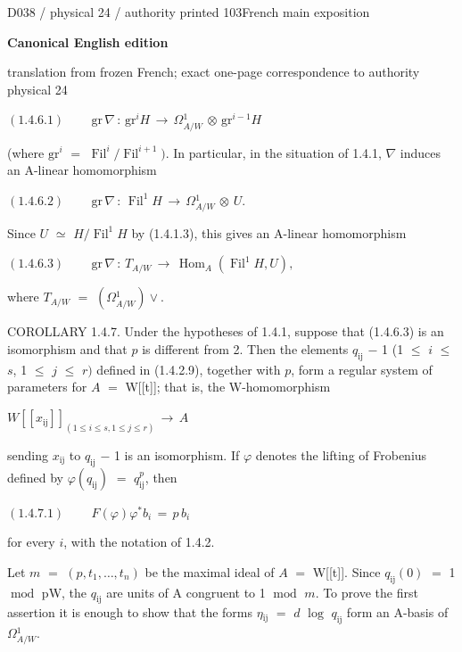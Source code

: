 \documentclass[9pt]{article}
\newcommand{\CanonText}[1]{\par{\fontsize{8.0}{9.35}\selectfont\RaggedRight #1\par}\vspace{2.2pt}}
\newcommand{\CanonDisplay}[1]{\par\vspace{1.2pt}\begin{center}{\fontsize{7.2}{8.4}\selectfont\(\displaystyle #1\)}\end{center}\vspace{1.2pt}}
\newcommand{\LayerTitle}{Canonical English edition}
\begin{document}
\noindent\begin{minipage}[t][\dimexpr\textheight-5pt\relax][t]{\textwidth}
{\sffamily\fontsize{7.3}{8.2}\selectfont\color{Quiet} D038 / physical 24 / authority printed 103\hfill French main exposition}
\par{}\vspace{4.5pt}
{\sffamily\fontsize{10.4}{11.6}\selectfont\bfseries\color{Accent} \LayerTitle}
\par{\sffamily\fontsize{6.7}{7.7}\selectfont\color{Quiet} translation from frozen French; exact one-page correspondence to authority physical 24}
\vspace{5pt}
\CanonDisplay{(1.4.6.1)\qquad\,\text{gr}\,\nabla{}\,:\,\text{gr}^{i}H\,\to{}\,\Omega{}^{1}_{A/W}\,\otimes{}\,\text{gr}^{i-1}H}
\CanonText{(where \(\text{gr}^{i}\) \(=\) \(\operatorname{Fil}^{i}/\operatorname{Fil}^{i+1})\). In particular, in the situation of 1.4.1, \(\nabla{}\) induces an A-linear homomorphism}
\CanonDisplay{(1.4.6.2)\qquad\,\text{gr}\,\nabla{}\,:\,\operatorname{Fil}^{1}H\,\to{}\,\Omega{}^{1}_{A/W}\,\otimes{}\,U.}
\CanonText{Since \(U\) \(\simeq{}\) \(H/\operatorname{Fil}^{1}H\) by (1.4.1.3), this gives an A-linear homomorphism}
\CanonDisplay{(1.4.6.3)\qquad\,\text{gr}\,\nabla{}\,:\,T_{A/W}\,\to{}\,\operatorname{Hom}_{A}(\operatorname{Fil}^{1}H,U),}
\CanonText{where \(T_{A/W}\) \(=\) \((\Omega{}^{1}_{A/W})\vee{}\).}
\CanonText{COROLLARY 1.4.7. Under the hypotheses of 1.4.1, suppose that (1.4.6.3) is an isomorphism and that \(p\) is different from 2. Then the elements \(q_{\mathrm{ij}}\) \(-\) 1 (1 \(\leq{}\) \(i\) \(\leq{}\) \(s\), 1 \(\leq{}\) \(j\) \(\leq{}\) \(r)\) defined in (1.4.2.9), together with \(p\), form a regular system of parameters for \(A\) \(=\) W[[t]]; that is, the W-homomorphism}
\CanonDisplay{W[[x_{\mathrm{ij}}]]_{(1\leq{}i\leq{}s,1\leq{}j\leq{}r)}\,\to{}\,A}
\CanonText{sending \(x_{\mathrm{ij}}\) to \(q_{\mathrm{ij}}\) \(-\) 1 is an isomorphism. If \(\varphi{}\) denotes the lifting of Frobenius defined by \(\varphi{}(q_{\mathrm{ij}})\) \(=\) \(q_{\mathrm{ij}}^{p}\), then}
\CanonDisplay{(1.4.7.1)\qquad\,F(\varphi{})\varphi{}^{*}b_{i}\,=\,p\,b_{i}}
\CanonText{for every \(i\), with the notation of 1.4.2.}
\CanonText{Let \(m\) \(=\) \((p,t_{1},\ldots{},t_{n})\) be the maximal ideal of \(A\) \(=\) W[[t]]. Since \(q_{\mathrm{ij}}(0)\) \(=\) 1 \(\operatorname{mod}\) pW, the \(q_{\mathrm{ij}}\) are units of A congruent to 1 \(\operatorname{mod}\) \(m\). To prove the first assertion it is enough to show that the forms \(\eta{}_{\mathrm{ij}}\) \(=\) \(d\) \(\operatorname{log}\) \(q_{\mathrm{ij}}\) form an A-basis of \(\Omega{}^{1}_{A/W}\).}

\end{minipage}
\end{document}
